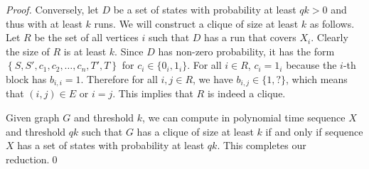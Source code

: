 \begin{proof}
Conversely, let $D$ be a set of states with probability at least $qk>0$
and thus with at least $k$ runs. We will construct a clique of size at least $k$
as follows. Let $R$ be the set of all vertices $i$ such that $D$ has a run that
covers $X_i$. Clearly the size of $R$ is at least $k$.  Since $D$ has non-zero
probability, it has the form $\left\{S,S',c_1,c_2,\dots,c_n,T',T\right\}$ for
$c_i\in \{0_i,1_i\}$. For all $i\in R$, $c_i=1_i$ because the $i$-th block has
$b_{i,i}=1$. Therefore for all $i,j\in R$, we have $b_{i,j}\in \{1,?\}$, which
means that $(i,j)\in E$ or $i=j$. This implies that $R$ is indeed a clique.

Given graph $G$ and threshold $k$, we can compute in
polynomial time sequence $X$ and threshold $qk$ such that $G$ has a
clique of size at least $k$ if and only if sequence $X$ has a
set of states with probability at least $qk$. This completes our reduction.\qed
\end{proof}


